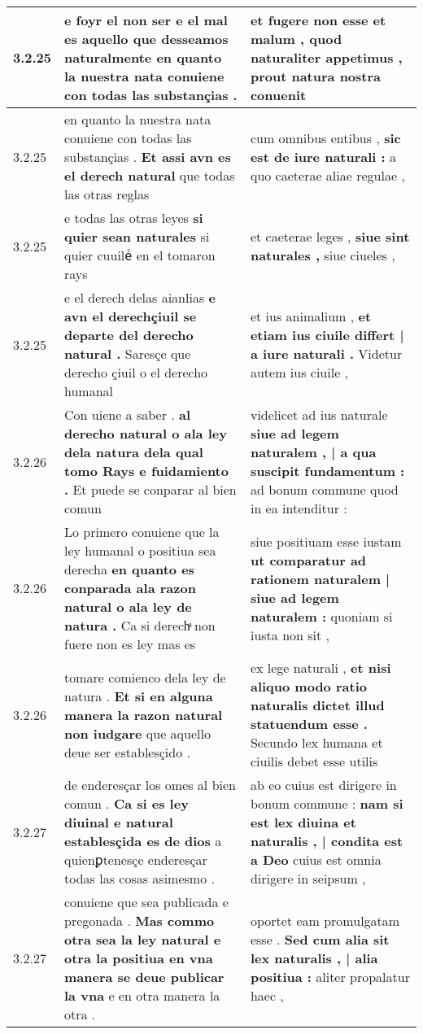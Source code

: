 \begin{tabular}{|p{1cm}|p{6.5cm}|p{6.5cm}|}
3.2.25 & e foyr el non ser \textbf{ e el mal es aquello que desseamos naturalmente } en quanto la nuestra nata conuiene con todas las substançias . & et fugere non esse et malum , \textbf{ quod naturaliter appetimus , } prout natura nostra conuenit \\\hline
3.2.25 & en quanto la nuestra nata conuiene con todas las substançias . \textbf{ Et assi avn es el derech natural } que todas las otras reglas & cum omnibus entibus , \textbf{ sic est de iure naturali : } a quo caeterae aliae regulae , \\\hline
3.2.25 & e todas las otras leyes \textbf{ si quier sean naturales } si quier cuuileᷤ en el tomaron rays & et caeterae leges , \textbf{ siue sint naturales , } siue ciueles , \\\hline
3.2.25 & e el derech delas aianlias \textbf{ e avn el derechçiuil se departe del derecho natural . } Saresçe que derecho çiuil o el derecho humanal & et ius animalium , \textbf{ et etiam ius ciuile differt | a iure naturali . } Videtur autem ius ciuile , \\\hline
3.2.26 & Con uiene a saber . \textbf{ al derecho natural o ala ley dela natura dela qual tomo Rays e fuidamiento . } Et puede se conparar al bien comun & videlicet ad ius naturale \textbf{ siue ad legem naturalem , | a qua suscipit fundamentum : } ad bonum commune quod in ea intenditur : \\\hline
3.2.26 & Lo primero conuiene que la ley humanal o positiua sea derecha \textbf{ en quanto es conparada ala razon natural o ala ley de natura . } Ca si derechͣ non fuere non es ley mas es & siue positiuam esse iustam \textbf{ ut comparatur ad rationem naturalem | siue ad legem naturalem : } quoniam si iusta non sit , \\\hline
3.2.26 & tomare comienco dela ley de natura . \textbf{ Et si en alguna manera la razon natural non iudgare } que aquello deue ser establesçido . & ex lege naturali , \textbf{ et nisi aliquo modo ratio naturalis dictet illud statuendum esse . } Secundo lex humana et ciuilis debet esse utilis \\\hline
3.2.27 & de enderesçar los omes al bien comun . \textbf{ Ca si es ley diuinal e natural establesçida es de dios } a quienꝑtenesçe enderesçar todas las cosas asimesmo . & ab eo cuius est dirigere in bonum commune : \textbf{ nam si est lex diuina et naturalis , | condita est a Deo } cuius est omnia dirigere in seipsum , \\\hline
3.2.27 & conuiene que sea publicada e pregonada . \textbf{ Mas commo otra sea la ley natural e otra la positiua en vna manera se deue publicar la vna } e en otra manera la otra . & oportet eam promulgatam esse . \textbf{ Sed cum alia sit lex naturalis , | alia positiua : } aliter propalatur haec , \\\hline

\end{tabular}
